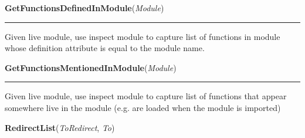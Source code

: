     \label{System:Utils:GetFunctionsDefinedInModule}

    \vspace{0.5ex}

\hspace{.8\funcindent}\begin{boxedminipage}{\funcwidth}

    \raggedright \textbf{GetFunctionsDefinedInModule}(\textit{Module})

    \vspace{-1.5ex}

    \rule{\textwidth}{0.5\fboxrule}
\setlength{\parskip}{2ex}
    Given live module, use inspect module to capture list of functions in 
    module whose definition attribute is equal to the module name.

\setlength{\parskip}{1ex}
    \end{boxedminipage}

    \label{System:Utils:GetFunctionsMentionedInModule}

    \vspace{0.5ex}

\hspace{.8\funcindent}\begin{boxedminipage}{\funcwidth}

    \raggedright \textbf{GetFunctionsMentionedInModule}(\textit{Module})

    \vspace{-1.5ex}

    \rule{\textwidth}{0.5\fboxrule}
\setlength{\parskip}{2ex}
    Given live module, use inspect module to capture list of functions that
    appear somewhere live in the module (e.g. are loaded when the module is
    imported)

\setlength{\parskip}{1ex}
    \end{boxedminipage}

    \label{System:Utils:RedirectList}

    \vspace{0.5ex}

\hspace{.8\funcindent}\begin{boxedminipage}{\funcwidth}

    \raggedright \textbf{RedirectList}(\textit{ToRedirect}, \textit{To})

\setlength{\parskip}{2ex}
\setlength{\parskip}{1ex}
    \end{boxedminipage}

